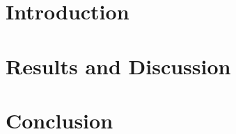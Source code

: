 \documentclass{CHE311}
\author{Annina Weber}{anninailona.weber@uzh.ch}
\begin{document}
\maketitle

\begin{multicols}{2}
\raggedcolumns

\section*{Introduction}

\section*{Results and Discussion}

\section*{Conclusion}

\printbibliography
\end{multicols}
\end{document}
